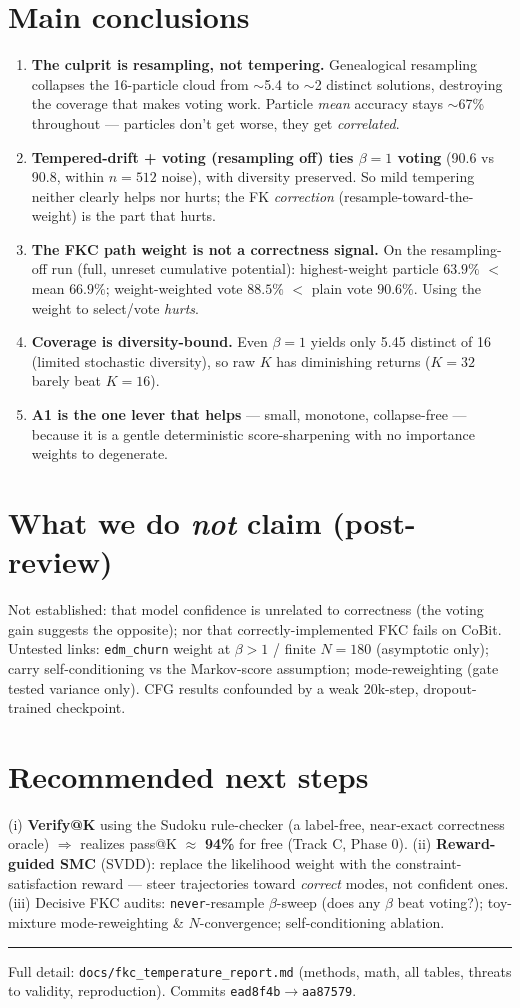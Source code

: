 \documentclass[10pt]{article}
\newcommand{\hl}[1]{\textcolor{blue!60!black}{\textbf{#1}}}
\begin{document}
\section*{Main conclusions}
\begin{enumerate}[label=\arabic*.]
\item \hl{The culprit is resampling, not tempering.} Genealogical resampling collapses the 16-particle cloud from $\sim$5.4 to $\sim$2 distinct solutions, destroying the coverage that makes voting work. Particle \emph{mean} accuracy stays $\sim$67\% throughout --- particles don't get worse, they get \emph{correlated}.
\item \hl{Tempered-drift + voting (resampling off) ties $\beta{=}1$ voting} (90.6 vs 90.8, within $n{=}512$ noise), with diversity preserved. So mild tempering neither clearly helps nor hurts; the FK \emph{correction} (resample-toward-the-weight) is the part that hurts.
\item \hl{The FKC path weight is not a correctness signal.} On the resampling-off run (full, unreset cumulative potential): highest-weight particle $63.9\%$ $<$ mean $66.9\%$; weight-weighted vote $88.5\%$ $<$ plain vote $90.6\%$. Using the weight to select/vote \emph{hurts}.
\item \hl{Coverage is diversity-bound.} Even $\beta{=}1$ yields only 5.45 distinct of 16 (limited stochastic diversity), so raw $K$ has diminishing returns ($K{=}32$ barely beat $K{=}16$).
\item \hl{A1 is the one lever that helps} --- small, monotone, collapse-free --- because it is a gentle deterministic score-sharpening with no importance weights to degenerate.
\end{enumerate}

\section*{What we do \emph{not} claim (post-review)}
Not established: that model confidence is unrelated to correctness (the voting gain suggests the opposite); nor that correctly-implemented FKC fails on CoBit. Untested links: \texttt{edm\_churn} weight at $\beta{>}1$ / finite $N{=}180$ (asymptotic only); carry self-conditioning vs the Markov-score assumption; mode-reweighting (gate tested variance only). CFG results confounded by a weak 20k-step, dropout-trained checkpoint.

\section*{Recommended next steps}
(i) \hl{Verify@K} using the Sudoku rule-checker (a label-free, near-exact correctness oracle) $\Rightarrow$ realizes pass@K $\approx$ \hl{94\%} for free (Track C, Phase 0).
(ii) \hl{Reward-guided SMC} (SVDD): replace the likelihood weight with the constraint-satisfaction reward --- steer trajectories toward \emph{correct} modes, not confident ones.
(iii) Decisive FKC audits: \texttt{never}-resample $\beta$-sweep (does any $\beta$ beat voting?); toy-mixture mode-reweighting \& $N$-convergence; self-conditioning ablation.

\vspace{2pt}\hrule\vspace{2pt}
{\footnotesize Full detail: \texttt{docs/fkc\_temperature\_report.md} (methods, math, all tables, threats to validity, reproduction). Commits \texttt{ead8f4b}$\to$\texttt{aa87579}.}
\end{document}
